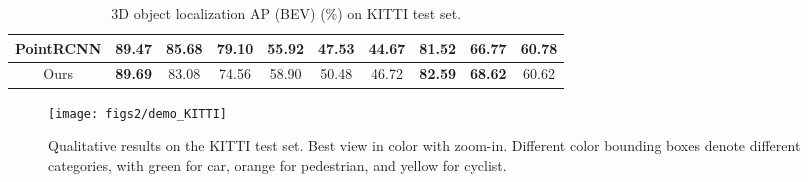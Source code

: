 \documentclass[letterpaper, 10 pt, conference]{ieeeconf}
\begin{document}
\begin{table*}[h]
\begin{center}
\begin{tabular}{c|ccc|ccc|ccc}
			PointRCNN\cite{shi2018pointrcnn}
			                                & 89.47                     & 85.68                            & 79.10                        & 55.92          & 47.53          & 44.67          & 81.52          & 66.77          & \textbf{60.78} \\ \hline
			Ours                            & \textbf{89.69}            & 83.08                            & 74.56                        & 58.90          & 50.48          & 46.72          & \textbf{82.59} & \textbf{68.62} & 60.62          \\ \hline
		\end{tabular}
		\caption{3D object localization AP (BEV) (\%) on KITTI test set. }
		\label{Tab:KITTI_TEST_BEV}
	\end{center}
	\vspace{-0.5cm}
\end{table*}

\begin{figure*}[h]
	\centering
	\texttt{[image: figs2/demo\_KITTI]}
	\caption[]{Qualitative results on the KITTI test set. Best view in color with zoom-in.
		Different color bounding boxes denote different categories, with green for car, orange for pedestrian, and yellow for cyclist. }
	\label{Fig:DEMOKITTI}
	\vspace{-0.3cm}
\end{figure*}
\end{document}
